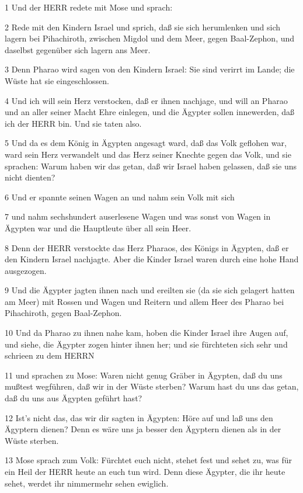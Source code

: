 \par 1 Und der HERR redete mit Mose und sprach:
\par 2 Rede mit den Kindern Israel und sprich, daß sie sich herumlenken und sich lagern bei Pihachiroth, zwischen Migdol und dem Meer, gegen Baal-Zephon, und daselbst gegenüber sich lagern ans Meer.
\par 3 Denn Pharao wird sagen von den Kindern Israel: Sie sind verirrt im Lande; die Wüste hat sie eingeschlossen.
\par 4 Und ich will sein Herz verstocken, daß er ihnen nachjage, und will an Pharao und an aller seiner Macht Ehre einlegen, und die Ägypter sollen innewerden, daß ich der HERR bin. Und sie taten also.
\par 5 Und da es dem König in Ägypten angesagt ward, daß das Volk geflohen war, ward sein Herz verwandelt und das Herz seiner Knechte gegen das Volk, und sie sprachen: Warum haben wir das getan, daß wir Israel haben gelassen, daß sie uns nicht dienten?
\par 6 Und er spannte seinen Wagen an und nahm sein Volk mit sich
\par 7 und nahm sechshundert auserlesene Wagen und was sonst von Wagen in Ägypten war und die Hauptleute über all sein Heer.
\par 8 Denn der HERR verstockte das Herz Pharaos, des Königs in Ägypten, daß er den Kindern Israel nachjagte. Aber die Kinder Israel waren durch eine hohe Hand ausgezogen.
\par 9 Und die Ägypter jagten ihnen nach und ereilten sie (da sie sich gelagert hatten am Meer) mit Rossen und Wagen und Reitern und allem Heer des Pharao bei Pihachiroth, gegen Baal-Zephon.
\par 10 Und da Pharao zu ihnen nahe kam, hoben die Kinder Israel ihre Augen auf, und siehe, die Ägypter zogen hinter ihnen her; und sie fürchteten sich sehr und schrieen zu dem HERRN
\par 11 und sprachen zu Mose: Waren nicht genug Gräber in Ägypten, daß du uns mußtest wegführen, daß wir in der Wüste sterben? Warum hast du uns das getan, daß du uns aus Ägypten geführt hast?
\par 12 Ist's nicht das, das wir dir sagten in Ägypten: Höre auf und laß uns den Ägyptern dienen? Denn es wäre uns ja besser den Ägyptern dienen als in der Wüste sterben.
\par 13 Mose sprach zum Volk: Fürchtet euch nicht, stehet fest und sehet zu, was für ein Heil der HERR heute an euch tun wird. Denn diese Ägypter, die ihr heute sehet, werdet ihr nimmermehr sehen ewiglich.
